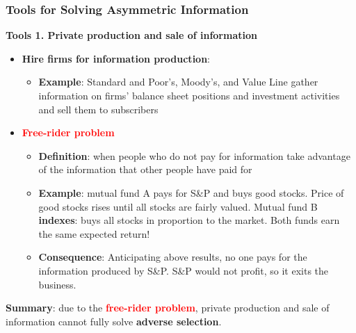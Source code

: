 \documentclass[aspectratio=169]{beamer}
\begin{document}
\begin{frame}
\frametitle{Tools for Solving Asymmetric Information}



\textbf{Tools 1. Private production and sale of information}
\begin{itemize}
    \item \textbf{Hire firms for information production}: 
    \begin{itemize}
        \item \textbf{Example}: Standard and Poor’s, Moody’s, and Value Line gather information on firms’ balance sheet positions and investment activities and sell them to subscribers \pause 
    \end{itemize}
    \item \textbf{\textcolor{red}{Free-rider problem}}
    \begin{itemize}
        \item \textbf{Definition}: when people who do not pay for information take advantage of the information that other people have paid for
        \item \textbf{Example}: mutual fund A pays for S\&P and buys good stocks. Price of good stocks rises until all stocks are fairly valued. Mutual fund B \textbf{indexes}: buys all stocks in proportion to the market. Both funds earn the same expected return! \pause 
        \item \textbf{Consequence}: Anticipating above results, no one pays for the information produced by S\&P. S\&P would not profit, so it exits the business. 
    \end{itemize}
\end{itemize}

\textbf{Summary}: due to the \textbf{\textcolor{red}{free-rider problem}}, private production and sale of information cannot fully solve \textbf{adverse selection}. 


\end{frame}
\end{document}
